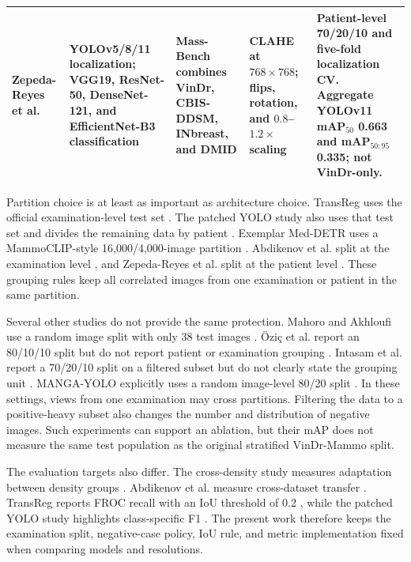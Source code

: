 \begin{table}[t]
\begin{threeparttable}
\begin{tabularx}{\textwidth}{@{}>{\raggedright\arraybackslash}p{2.05cm}>{\raggedright\arraybackslash}p{3.35cm}>{\raggedright\arraybackslash}p{2.55cm}>{\raggedright\arraybackslash}p{2.75cm}X@{}}
Zepeda-Reyes et al. \cite{zepeda2026density} & YOLOv5/8/11 localization; VGG19, ResNet-50, DenseNet-121, and EfficientNet-B3 classification & Mass-Bench combines VinDr, CBIS-DDSM, INbreast, and DMID & CLAHE at $768\!\times\!768$; flips, rotation, and $0.8$--$1.2\times$ scaling & Patient-level 70/20/10 and five-fold localization CV. Aggregate YOLOv11 mAP$_{50}$ 0.663 and mAP$_{50:95}$ 0.335; not VinDr-only. \\
\bottomrule
\end{tabularx}
\end{threeparttable}
\end{table}

Partition choice is at least as important as architecture choice. TransReg uses
the official examination-level test set \cite{nguyen2023transreg}. The patched
YOLO study also uses that test set and divides the remaining data by patient
\cite{bulatovic2025patched}. Exemplar Med-DETR uses a MammoCLIP-style
16,000/4,000-image partition \cite{bhat2025exemplar}. Abdikenov et al. split at
the examination level \cite{abdikenov2025transfer}, and Zepeda-Reyes et al.
split at the patient level \cite{zepeda2026density}. These grouping rules keep
all correlated images from one examination or patient in the same partition.

Several other studies do not provide the same protection. Mahoro and Akhloufi
use a random image split with only 38 test images \cite{mahoro2023oneshot}.
\"{O}zi\c{c} et al. report an 80/10/10 split but do not report patient or
examination grouping \cite{ozic2023scenarios}. Intasam et al. report a 70/20/10
split on a filtered subset but do not clearly state the grouping unit
\cite{intasam2025embedded}. MANGA-YOLO explicitly uses a random image-level
80/20 split \cite{trang2025manga}. In these settings, views from one examination
may cross partitions. Filtering the data to a positive-heavy subset also
changes the number and distribution of negative images. Such experiments can
support an ablation, but their mAP does not measure the same test population as
the original stratified VinDr-Mammo split.

The evaluation targets also differ. The cross-density study measures adaptation
between density groups \cite{nguyen2023crossdensity}. Abdikenov et al. measure
cross-dataset transfer \cite{abdikenov2025transfer}. TransReg reports FROC
recall with an IoU threshold of 0.2 \cite{nguyen2023transreg}, while the patched
YOLO study highlights class-specific F1 \cite{bulatovic2025patched}. The
present work therefore keeps the examination split, negative-case policy, IoU
rule, and metric implementation fixed when comparing models and resolutions.

